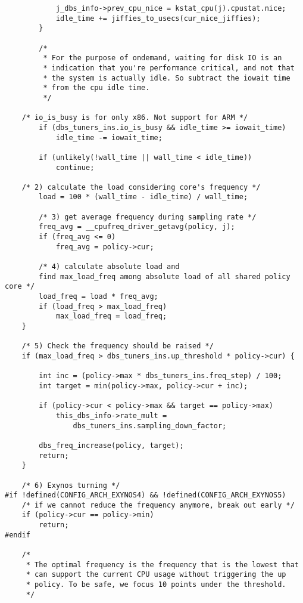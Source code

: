 \begin{lstlisting}
            j_dbs_info->prev_cpu_nice = kstat_cpu(j).cpustat.nice;
            idle_time += jiffies_to_usecs(cur_nice_jiffies);
        }

        /*
         * For the purpose of ondemand, waiting for disk IO is an
         * indication that you're performance critical, and not that
         * the system is actually idle. So subtract the iowait time
         * from the cpu idle time.
         */
	
	/* io_is_busy is for only x86. Not support for ARM */
        if (dbs_tuners_ins.io_is_busy && idle_time >= iowait_time)
            idle_time -= iowait_time;

        if (unlikely(!wall_time || wall_time < idle_time))
            continue;

	/* 2) calculate the load considering core's frequency */
        load = 100 * (wall_time - idle_time) / wall_time;

        /* 3) get average frequency during sampling rate */
        freq_avg = __cpufreq_driver_getavg(policy, j);
        if (freq_avg <= 0)
            freq_avg = policy->cur;

        /* 4) calculate absolute load and 
        find max_load_freq among absolute load of all shared policy core */
        load_freq = load * freq_avg;
        if (load_freq > max_load_freq)
            max_load_freq = load_freq;
    }

    /* 5) Check the frequency should be raised */
    if (max_load_freq > dbs_tuners_ins.up_threshold * policy->cur) {
	
        int inc = (policy->max * dbs_tuners_ins.freq_step) / 100;
        int target = min(policy->max, policy->cur + inc);

        if (policy->cur < policy->max && target == policy->max)
            this_dbs_info->rate_mult =
                dbs_tuners_ins.sampling_down_factor;

        dbs_freq_increase(policy, target);
        return;
    }

    /* 6) Exynos turning */
#if !defined(CONFIG_ARCH_EXYNOS4) && !defined(CONFIG_ARCH_EXYNOS5)
    /* if we cannot reduce the frequency anymore, break out early */
    if (policy->cur == policy->min)
        return;
#endif

    /*
     * The optimal frequency is the frequency that is the lowest that
     * can support the current CPU usage without triggering the up
     * policy. To be safe, we focus 10 points under the threshold.
     */


\end{lstlisting}
